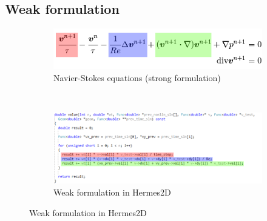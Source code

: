 \documentclass{beamer}
\begin{document}
\subsection{Weak formulation}
\begin{frame}
\begin{figure}[H]
		\centering
		\begin{subfigure}{0.9\textwidth}
			\centering
			\includegraphics[width=.65\textwidth]{codeimg/NSEquations.png}
			\vspace{-3mm}
			\caption{Navier-Stokes equations (strong formulation)}
		\end{subfigure}
		\ \\
		\vspace{13mm}
		\begin{subfigure}{.95\textwidth}
		\centering
			\includegraphics[width=.94\textwidth]{codeimg/weakForm.png}
			\vspace{-5mm}
			\caption{Weak formulation in Hermes2D}
		\end{subfigure}
	\end{figure}
\end{frame}
\end{document}
